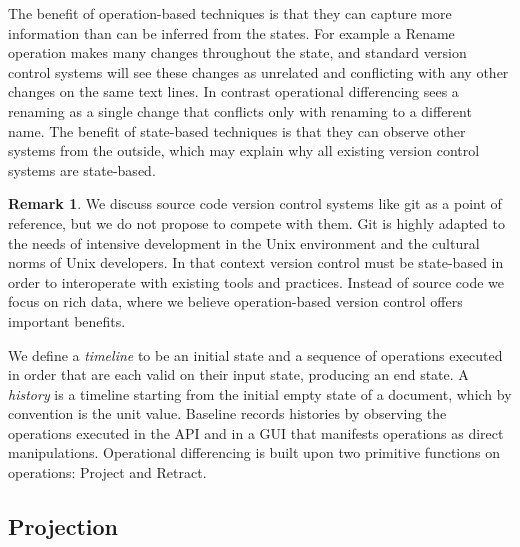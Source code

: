 \documentclass[english,submission]{programming}
\theoremstyle{definition}
\newtheorem*{remark}{Remark}
\begin{document}
The benefit of operation-based techniques is that they can capture more information than can be inferred from the states.
For example a \textsf{Rename} operation makes many changes throughout the state, and standard version control systems will see these changes as unrelated and conflicting with any other changes on the same text lines. In contrast operational differencing sees a renaming as a single change that conflicts only with renaming to a different name.
The benefit of state-based techniques is that they can observe other systems from the outside, which may explain why all existing version control systems are state-based.

\begin{remark}
We discuss source code version control systems like git as a point of reference, but we do not propose to compete with them. Git is highly adapted to the needs of intensive development in the Unix environment and the cultural norms of Unix developers. In that context version control must be state-based in order to interoperate with existing tools and practices. Instead of source code we focus on rich data, where we believe operation-based version control offers important benefits.
\end{remark}

We define a \textit{timeline} to be an initial state and a sequence of operations executed in order that are each valid on their input state, producing an end state.
A \textit{history} is a timeline starting from the initial empty state of a document, which by convention is the unit value.
Baseline records histories by observing the operations executed in the API and in a GUI that manifests operations as direct manipulations. Operational differencing is built upon two primitive functions on operations: \textsf{Project} and \textsf{Retract}.

\subsection{Projection}
\end{document}
